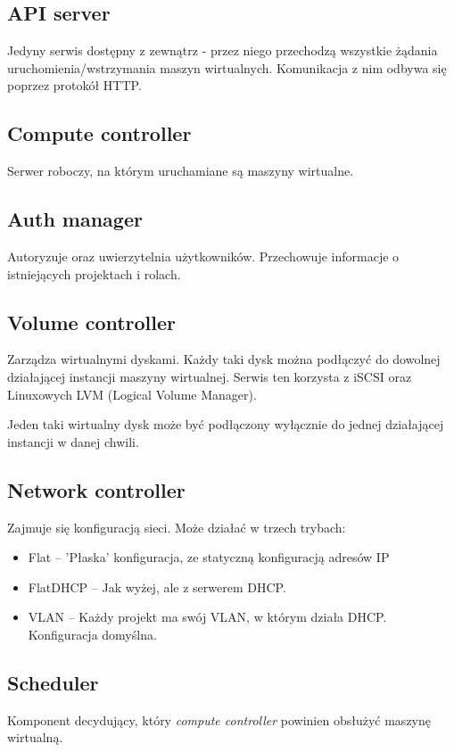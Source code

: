 \subsection{API server}
Jedyny serwis dostępny z zewnątrz - przez niego przechodzą wszystkie żądania uruchomienia/wstrzymania maszyn wirtualnych. Komunikacja z nim odbywa się poprzez protokół HTTP. 

\subsection{Compute controller}
Serwer roboczy, na którym uruchamiane są maszyny wirtualne.

\subsection{Auth manager}
Autoryzuje oraz uwierzytelnia użytkowników. Przechowuje informacje o istniejących projektach i rolach.

\subsection{Volume controller}
Zarządza wirtualnymi dyskami. Każdy taki dysk można podłączyć do dowolnej działającej instancji maszyny wirtualnej. Serwis ten korzysta z iSCSI oraz Linuxowych LVM (Logical Volume Manager).

Jeden taki wirtualny dysk może być podłączony wyłącznie do jednej działającej instancji w danej chwili.

\subsection{Network controller}
Zajmuje się konfiguracją sieci. Może działać w trzech trybach:
\begin{itemize}
\item Flat -- 'Płaska' konfiguracja, ze statyczną konfiguracją adresów IP
\item FlatDHCP -- Jak wyżej, ale z serwerem DHCP.
\item VLAN -- Każdy projekt ma swój VLAN, w którym działa DHCP. Konfiguracja domyślna.
\end{itemize}

\subsection{Scheduler}
Komponent decydujący, który {\it compute controller} powinien obsłużyć maszynę wirtualną.

